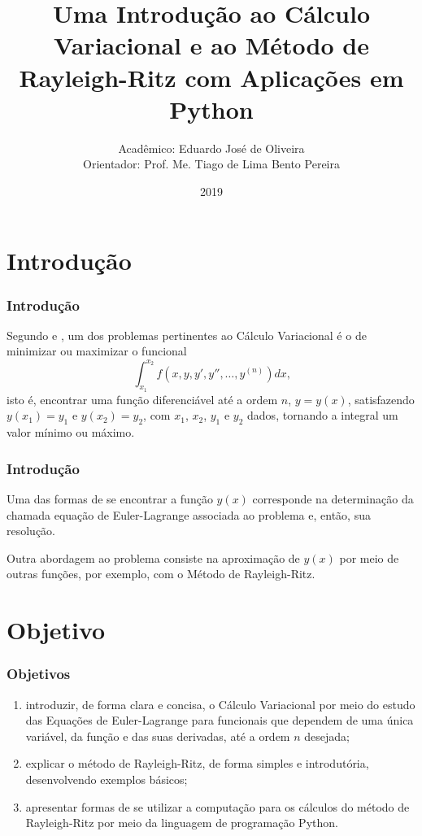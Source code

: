 \documentclass{beamer}
\title[Cálculo Variacional e o Método de Rayleigh-Ritz]{Uma Introdução ao Cálculo Variacional e ao Método de Rayleigh-Ritz com Aplicações em Python}
\author[Eduardo José de Oliveira]{
	Acadêmico: Eduardo José de Oliveira\\
	Orientador: Prof. Me. Tiago de Lima Bento Pereira
}
\institute[Universidade Estadual de Goiás]{
	UNIVERSIDADE ESTADUAL DE GOIÁS\\
  	Câmpus Anápolis de Ciências Exatas e Tecnológicas Henrique Santillo \\
  	\vfill
  	Curso de Matemática
}
\date[2019]{2019}
\begin{document}
	\begin{frame}[plain]
	  \titlepage
	\end{frame}

	\section{Introdução}
	\begin{frame}
		\frametitle{Introdução}
		
		\justify
		Segundo  e , um dos problemas pertinentes ao Cálculo Variacional é o de minimizar ou maximizar o funcional
		$$
			\int_{x_1}^{x_2} f(x, y, y', y'', \dots, y^{(n)})dx\text{,}
		$$
		isto é, encontrar uma função diferenciável até a ordem $n$, $y=y(x)$, satisfazendo $y(x_1)=y_1$ e $y(x_2)=y_2$, com $x_1$, $x_2$, $y_1$ e $y_2$ dados, tornando a integral um valor mínimo ou máximo.
	\end{frame}
	
	\begin{frame}
		\frametitle{Introdução}
		\justify

		Uma das formas de se encontrar a função $y(x)$ corresponde na determinação da chamada equação de Euler-Lagrange associada ao problema e, então, sua resolução.
		\vspace{10pt}
		\pause
		
		Outra abordagem ao problema consiste na aproximação de $y(x)$ por meio de outras funções, por exemplo, com o Método de Rayleigh-Ritz.
	\end{frame}
	
	\section{Objetivo}
	\begin{frame}
		\frametitle{Objetivos}
	
		\begin{enumerate}
			\justifying
			\item introduzir, de forma clara e concisa, o Cálculo Variacional por meio do estudo das Equações de Euler-Lagrange para funcionais que dependem de uma única variável, da função e das suas derivadas, até a ordem $n$ desejada;
			
			\item explicar o método de Rayleigh-Ritz, de forma simples e introdutória, desenvolvendo exemplos básicos;
			
			\item apresentar formas de se utilizar a computação para os cálculos do método de Rayleigh-Ritz por meio da linguagem de programação Python.
		\end{enumerate}
	\end{frame}
\end{document}
